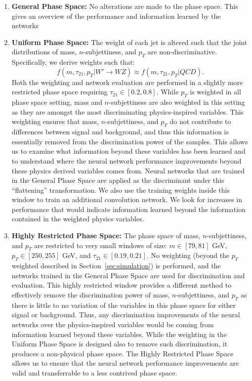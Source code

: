 \begin{enumerate}

\item \textbf{General Phase Space:} No alterations are made to the phase space.  This gives an overview of the performance and information learned by the networks

\item  \textbf{Uniform Phase Space:}  The weight of each jet is altered such that the joint distributions of mass, $n$-subjettiness, and $p_T$ are non-discriminative.  Specifically, we derive weights such that:
\begin{equation}
  f(m, \tau_{21}, p_T| W'\rightarrow WZ) \approx f(m, \tau_{21}, p_T| QCD).
\end{equation}
Both the weighting and network evaluation are performed in a slightly more restricted phase space requiring $\tau_{21}\in [0.2, 0.8]$. While $p_T$ is weighted in all phase space setting, mass and $n$-subjettiness are also weighted in this setting as they are amongst the most discriminating physics-inspired variables.  This weighting ensures that mass, $n$-subjettiness, and $p_T$ do not contribute to differences between signal and background, and thus this information is essentially removed from the discrimination power of the samples.  This allows us to examine what information beyond these variables has been learned and to understand where the neural network performance improvements beyond these physics derived variables comes from.  Neural networks that are trained in the General Phase Space are applied as the discriminant under this ``flattening'' transformation. We also use the training weights inside this window to train an additional convolution network. We look for increases in performance that would indicate information learned beyond the information contained in the weighted physics variables.

\item \textbf{Highly Restricted Phase Space:} The phase space of mass, $n$-subjettiness, and $p_T$ are restricted to very small windows of size: $m\in [79, 81]$ GeV,  $p_T \in [250, 255]$ GeV, and  $\tau_{21} \in [0.19, 0.21]$. No weighting (beyond the $p_{T}$ weighted described in Section~\ref{sec:simulation}) is performed, and the networks trained in the General Phase Space are used for discrimination and evaluation.  This highly restricted window provides a different method to effectively remove the discrimination power of mass, $n$-subjettiness, and $p_T$ as there is little to no variation of the variables in this phase space for either signal or background.  Thus, any discrimination improvements of the neural networks over the physics-inspired variables would be coming from information learned beyond these variables.  While the weighting in the Uniform  Phase Space is designed also to remove such discrimination, it produces a non-physical phase space.  The Highly Restricted Phase Space allows us to ensure that the neural network performance improvements are valid and transferrable to a less contrived phase space.

\end{enumerate}
